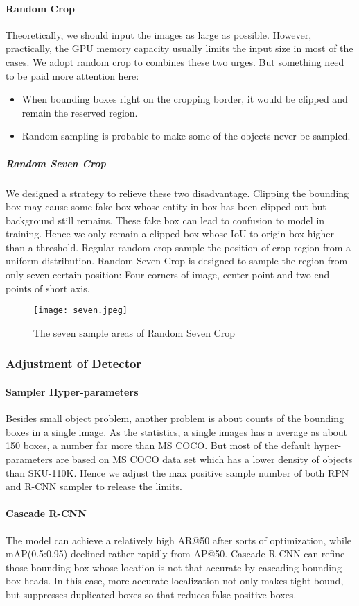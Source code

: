 \documentclass{article}
\begin{document}
\paragraph{Random Crop} Theoretically, we should input the images as large as possible. However, practically, the GPU memory capacity usually limits the input size in most of the cases. We adopt random crop to combines these two urges. But something need to be paid more attention here:
\begin{itemize}
    \item When bounding boxes right on the cropping border, it would be clipped and remain the reserved region.
    \item Random sampling is probable to make some of the objects never be sampled. 
\end{itemize}
\subparagraph{Random Seven Crop} We designed a strategy to relieve these two disadvantage. Clipping the bounding box may cause some fake box whose entity in box has been clipped out but background still remains. These fake box can lead to confusion to model in training. Hence we only remain a clipped box whose IoU to origin box higher than a threshold. Regular random crop sample the position of crop region from a uniform distribution. Random Seven Crop is designed to sample the region from only seven certain position: Four corners of image, center point and two end points of short axis.
\begin{figure}[htb]
    \centering
    \texttt{[image: seven.jpeg]}
    \caption{The seven sample areas of Random Seven Crop}
    \label{fig:my_label}
\end{figure}
\subsubsection{Adjustment of Detector}
\paragraph{Sampler Hyper-parameters}Besides small object problem, another problem is about counts of the bounding boxes in a single image. As the statistics, a single images has a average as about 150 boxes, a number far more than MS COCO. But most of the default hyper-parameters are based on MS COCO data set which has a lower density of objects than SKU-110K. Hence we adjust the max positive sample number of both RPN and R-CNN sampler to release the limits.
\paragraph{Cascade R-CNN} The model can achieve a relatively high AR@50 after sorts of optimization, while mAP(0.5:0.95) declined rather rapidly from AP@50. Cascade R-CNN\cite{cascade} can refine those bounding box whose location is not that accurate by cascading bounding box heads. In this case, more accurate localization not only makes tight bound, but suppresses duplicated boxes so that reduces false positive boxes.
\end{document}
